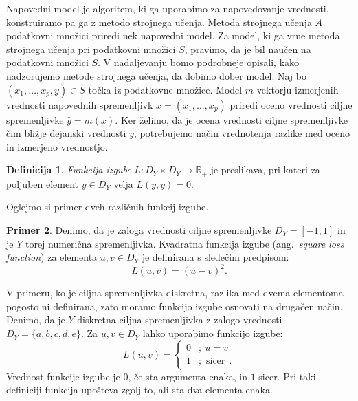 \documentclass[12pt,a4paper,twoside]{article}
\theoremstyle{definition} %
\newtheorem{definicija}{Definicija}[section]
\newtheorem{primer}[definicija]{Primer}
\theoremstyle{plain} %
\numberwithin{equation}{section}  %
\begin{document}
Napovedni model je algoritem, ki ga uporabimo za napovedovanje vrednosti, konstruiramo pa ga z metodo strojnega učenja.
Metoda strojnega učenja $A$ podatkovni množici priredi nek napovedni model. 
Za model, ki ga vrne metoda strojnega učenja pri podatkovni množici $S$, pravimo, da je bil naučen na podatkovni množici $S$.
V nadaljevanju bomo podrobneje opisali, kako nadzorujemo metode strojnega učenja, da dobimo dober model.
Naj bo $(x_1, \ldots, x_p,y) \in S$ točka iz podatkovne množice.
Model $m$ vektorju izmerjenih vrednosti napovednih spremenljivk $x=(x_1, \ldots, x_p)$ priredi oceno vrednosti ciljne spremenljivke $\hat{y}=m(x)$.
Ker želimo, da je ocena vrednosti ciljne spremenljivke čim bližje dejanski vrednosti $y$, potrebujemo način vrednotenja razlike med oceno in izmerjeno vrednostjo.

\begin{definicija}
	\emph{Funkcija izgube} $L: D_Y \times D_Y \rightarrow \mathbb{R}_+$ je preslikava, pri kateri za poljuben element $y \in D_Y$ velja $L(y,y) = 0$.
\end{definicija}

Oglejmo si primer dveh različnih funkcij izgube.

\begin{primer}
Denimo, da je zaloga vrednosti ciljne spremenljivke $D_Y = [-1,1]$ in je $Y$ torej numerična spremenljivka. 
Kvadratna funkcija izgube (ang.~\textsl{square loss function}) za elementa $u, v \in D_Y$ je definirana s sledečim predpisom:
$$
L(u,v) = (u - v)^2.
$$

V primeru, ko je ciljna spremenljivka diskretna, razlika med dvema elementoma pogosto ni definirana, zato moramo funkcijo izgube osnovati na drugačen način. 
Denimo, da je $Y$ diskretna ciljna spremenljivka z zalogo vrednosti $D_Y = \{a,b,c,d,e\}$. 
Za $u, v \in D_Y$ lahko uporabimo funkcijo izgube:
\[
	L(u,v) =
	\begin{cases}
	0 &;\ u= v \\
	1 &; \text{ sicer}\ \ .
	\end{cases}
\]
Vrednost funkcije izgube je $0$, če sta argumenta enaka, in $1$ sicer. 
Pri taki definiciji funkcija upošteva zgolj to, ali sta dva elementa enaka.
\end{primer}
\end{document}
